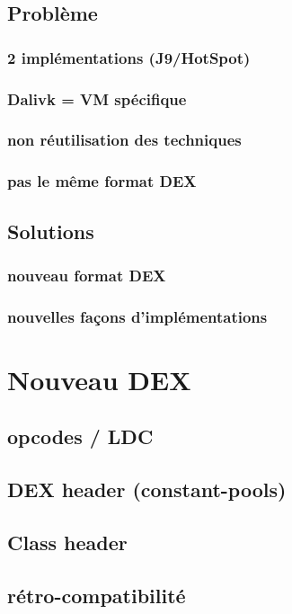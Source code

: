 \documentclass{sigplanconf}
\begin{document}
  \subsection{Probl\`eme}

    \subsubsection{2 impl\'ementations (J9/HotSpot)}
    \subsubsection{Dalivk = VM sp\'ecifique}
    \subsubsection{non r\'eutilisation des techniques}
    \subsubsection{pas le m\^eme format DEX}

  \subsection{Solutions}

    \subsubsection{nouveau format DEX}
    \subsubsection{nouvelles fa\c cons d'impl\'ementations}

\section{Nouveau DEX}

  \subsection{opcodes / LDC}
  \subsection{DEX header (constant-pools)}
  \subsection{Class header}
  \subsection{r\'etro-compatibilit\'e}
\end{document}
